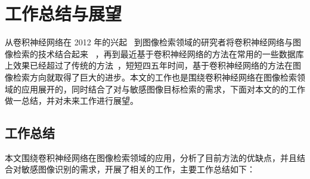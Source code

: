
\chapter{工作总结与展望}\label{chapter:conclusion}

从卷积神经网络在 2012 年的兴起~\cite{Krizhevsky2012ImageNetCW} 到图像检索领域的研究者将卷积神经网络与图像检索的技术结合起来~\cite{Babenko2014NeuralCF,Gong2014MultiscaleOP} ，再到最近基于卷积神经网络的方法在常用的一些数据库上效果已经超过了传统的方法~\cite{Gordo2016DeepIR,Noh2017LargeScaleIR}，短短四五年时间，基于卷积神经网络的方法在图像检索方向就取得了巨大的进步。本文的工作也是围绕卷积神经网络在图像检索领域的应用展开的，同时结合了对与敏感图像目标检索的需求，下面对本文的的工作做一总结，并对未来工作进行展望。

\section{工作总结}
本文围绕卷积神经网络在图像检索领域的应用，分析了目前方法的优缺点，并且结合对敏感图像识别的需求，开展了相关的工作，主要工作总结如下：

